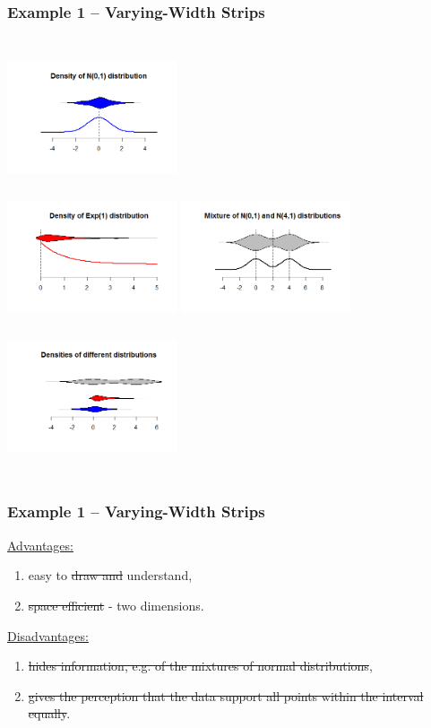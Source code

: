 \documentclass[11pt,usenames,dvipsnames,svgnames,x11names]{beamer}
\theoremstyle{plain}
\theoremstyle{definition}
\theoremstyle{remark}
\begin{document}
\begin{frame}
	\frametitle{Example 1 -- Varying-Width Strips}
	\begin{columns}[t]
			\centering
			\includegraphics[width=5cm,height=4cm]{11111.png}\\
			\includegraphics[width=5cm,height=4cm]{22222.png}
		\centering
		\includegraphics[width=5cm,height=4cm]{33333.png}\\
		\includegraphics[width=5cm,height=4cm]{44444.png}
	\end{columns}
\end{frame}

\begin{frame}
	\frametitle{Example 1 -- Varying-Width Strips}
	\underline{Advantages:}	
	\begin{enumerate}
		\item easy to \sout{draw and} understand,
		\item \sout{space efficient} - two dimensions.
	\end{enumerate}
	\bigskip
	\underline{Disadvantages:}
	\begin{enumerate}
		\item \sout{hides information, e.g. of the mixtures of normal distributions},
		\item \sout{gives the perception that the data support all points within the interval equally}.
	\end{enumerate}
\end{frame}
\end{document}
